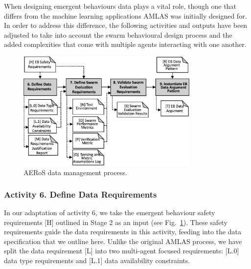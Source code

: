 \documentclass[runningheads]{llncs}
\begin{document}
When designing emergent behaviours data plays a vital role, though one that differs from the machine learning applications AMLAS was initially designed for. In order to address this difference, the following activities and outputs have been adjusted to take into account the swarm behavioural design process and the added complexities that come with multiple agents interacting with one another.

\vspace{-4ex}
\begin{figure}
	\centering
	\includegraphics[width=0.8\textwidth]{figures/AMLAS-STAGE-3-V4.png}
	\vspace{-2ex}
	\caption{AERoS data management process.}
	\label{amlas-a-stage3}
	\vspace{-4ex}
\end{figure}

\vspace{-2ex}
\subsubsection*{Activity 6. Define Data Requirements}


In our adaptation of activity 6, we take the emergent behaviour safety requirements [H] outlined in Stage 2 as an input (see Fig.~\ref{amlas-a-stage3}). These safety requirements guide the data requirements in this activity, feeding into the data specification that we outline here. Unlike the original AMLAS process, we have split the data requirement [L] into two multi-agent focused requirements: [L.0] data type requirements and [L.1] data availability constraints.
\end{document}
